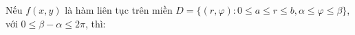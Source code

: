 \documentclass[preview]{standalone}
\begin{document}
\begin{center}
Nếu $f(x, y)$ là hàm liên tục trên miền $D = \{(r, \varphi): 0 \leq a \leq r \leq b, \alpha \leq \varphi \leq \beta\}$, với $0 \leq \beta - \alpha \leq 2\pi$, thì:
\end{center}
\end{document}
